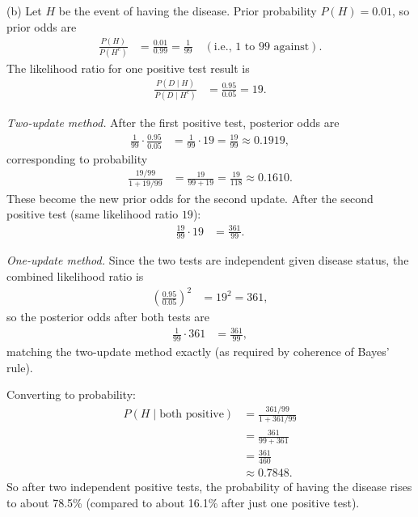 \documentclass[11pt]{article}
\begin{document}
(b) Let $H$ be the event of having the disease. Prior probability $P(H)=0.01$, so prior odds are
\begin{align*}
\frac{P(H)}{P(H^c)} &= \frac{0.01}{0.99} = \frac{1}{99} \quad (\text{i.e., 1 to 99 against}).
\end{align*}
The likelihood ratio for one positive test result is
\begin{align*}
\frac{P(D\mid H)}{P(D\mid H^c)} &= \frac{0.95}{0.05} = 19.
\end{align*}

\textit{Two-update method.} After the first positive test, posterior odds are
\begin{align*}
\frac{1}{99}\cdot\frac{0.95}{0.05} &= \frac{1}{99}\cdot 19 = \frac{19}{99} \approx 0.1919,
\end{align*}
corresponding to probability
\begin{align*}
\frac{19/99}{1+19/99} &= \frac{19}{99+19} = \frac{19}{118} \approx 0.1610.
\end{align*}
These become the new prior odds for the second update. After the second positive test (same likelihood ratio $19$):
\begin{align*}
\frac{19}{99}\cdot 19 &= \frac{361}{99}.
\end{align*}

\textit{One-update method.} Since the two tests are independent given disease status, the combined likelihood ratio is
\begin{align*}
\left(\frac{0.95}{0.05}\right)^2 &= 19^2 = 361,
\end{align*}
so the posterior odds after both tests are
\begin{align*}
\frac{1}{99}\cdot 361 &= \frac{361}{99},
\end{align*}
matching the two-update method exactly (as required by coherence of Bayes' rule).

Converting to probability:
\begin{align*}
P(H\mid \text{both positive}) &= \frac{361/99}{1+361/99} \\
&= \frac{361}{99+361} \\
&= \frac{361}{460} \\
&\approx 0.7848.
\end{align*}
So after two independent positive tests, the probability of having the disease rises to about 78.5\% (compared to about 16.1\% after just one positive test).
\end{document}
